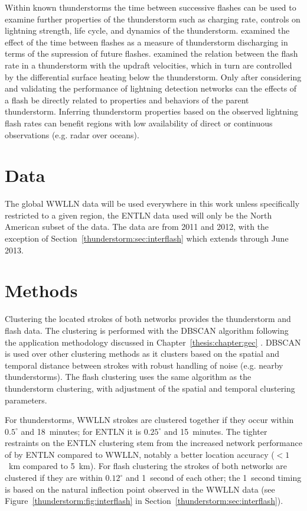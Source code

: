 Within known thunderstorms the time between successive flashes can be used to examine further properties of the thunderstorm such as charging rate, controls on lightning strength, life cycle, and dynamics of the thunderstorm.
\citet{Zoghzoghy2013} examined the effect of the time between flashes as a measure of thunderstorm discharging in terms of the supression of future flashes.
\citet{Zipser1994} examined the relation between the flash rate in a thunderstorm with the updraft velocities, which in turn are controlled by the differential surface heating below the thunderstorm.
Only after considering and validating the performance of lightning detection networks can the effects of a flash be directly related to properties and behaviors of the parent thunderstorm.
Inferring thunderstorm properties based on the observed lightning flash rates can benefit regions with low availability of direct or continuous observations (e.g. radar over oceans).

\section{Data}

The global WWLLN data will be used everywhere in this work unless specifically restricted to a given region, the ENTLN data used will only be the North American subset of the data.
The data are from 2011 and 2012, with the exception of Section~\ref{thunderstorm:sec:interflash} which extends through June 2013.

\section{Methods}

Clustering the located strokes of both networks provides the thunderstorm and flash data.
The clustering is performed with the DBSCAN algorithm \citep{Ester1996, Kriegel2011a} following the application methodology discussed in Chapter~\ref{thesis:chapter:gec} \citep{Hutchins2014}.
DBSCAN is used over other clustering methods as it clusters based on the spatial and temporal distance between strokes with robust handling of noise (e.g. nearby thunderstorms).
The flash clustering uses the same algorithm as the thunderstorm clustering, with adjustment of the spatial and temporal clustering parameters.

For thunderstorms, WWLLN strokes are clustered together if they occur within $0.5^\circ$ and 18~minutes; for ENTLN it is $0.25^\circ$ and 15~minutes.
The tighter restraints on the ENTLN clustering stem from the increased network performance of by ENTLN compared to WWLLN, notably a better location accuracy ($<1$~km compared to 5~km).
For flash clustering the strokes of both networks are clustered if they are within $0.12^\circ$ and 1~second of each other; the 1~second timing is based on the natural inflection point observed in the WWLLN data (see Figure~\ref{thunderstorm:fig:interflash} in Section~\ref{thunderstorm:sec:interflash}).

